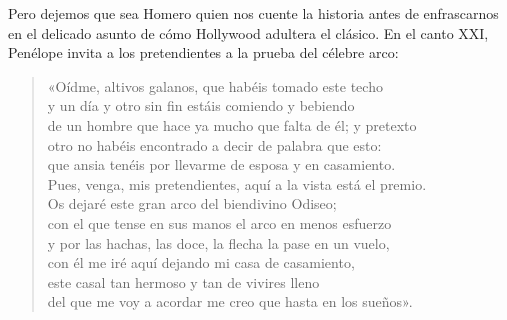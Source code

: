 %

Pero dejemos que sea Homero quien nos cuente la historia antes de enfrascarnos en el delicado asunto de cómo Hollywood adultera el clásico. En el canto XXI, Penélope invita a los pretendientes a la prueba del célebre arco:

\begin{verse}
«Oídme, altivos galanos, que habéis tomado este techo\\
y un día y otro sin fin estáis comiendo y bebiendo\\
de un hombre que hace ya mucho que falta de él; y pretexto\\
otro no habéis encontrado a decir de palabra que esto:\\
que ansia tenéis por llevarme de esposa y en casamiento.\\
Pues, venga, mis pretendientes, aquí a la vista está el premio.\\
Os dejaré este gran arco del biendivino Odiseo;\\
con el que tense en sus manos el arco en menos esfuerzo\\
y por las hachas, las doce, la flecha la pase en un vuelo,\\
con él me iré aquí dejando mi casa de casamiento,\\
este casal tan hermoso y tan de vivires lleno\\
del que me voy a acordar me creo que hasta en los sueños».
\end{verse}

